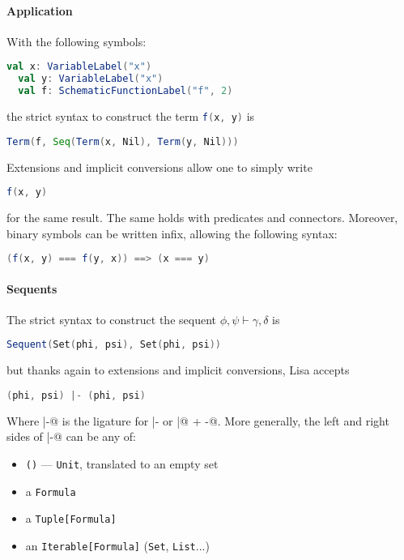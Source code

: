 \paragraph{Application}
With the following symbols:
\begin{lstlisting}[language=Scala]
  val x: VariableLabel("x")
  val y: VariableLabel("x")
  val f: SchematicFunctionLabel("f", 2)
\end{lstlisting}
the strict syntax to construct the term \lstinline[language=Scala]|f(x, y)| is
\begin{lstlisting}[language=Scala]
  Term(f, Seq(Term(x, Nil), Term(y, Nil)))
\end{lstlisting}
Extensions and implicit conversions allow one to simply write
\begin{lstlisting}[language=Scala]
  f(x, y)
\end{lstlisting}
for the same result. The same holds with predicates and connectors. Moreover, binary symbols can be written infix, allowing the following syntax:

\begin{lstlisting}[language=Scala]
  (f(x, y) === f(y, x)) ==> (x === y)
\end{lstlisting}

\paragraph{Sequents}
The strict syntax to construct the sequent $\phi, \psi \vdash \gamma, \delta$ is
\begin{lstlisting}[language=Scala]
  Sequent(Set(phi, psi), Set(phi, psi))
\end{lstlisting}
but thanks again to  extensions and implicit conversions, Lisa accepts
\begin{lstlisting}[language=Scala]
  (phi, psi) |- (phi, psi)
\end{lstlisting}
Where \lstinline@|-@ is the ligature for { |- } or \lstinline@|@ + \lstinline@-@. More generally, the left and right sides of \lstinline@|-@ can be any of:
\vspace*{-0.7em}
\begin{itemize}
  \setlength\itemsep{-0.5em}
  \item \lstinline|()| --- \lstinline|Unit|, translated to an empty set
  \item a \lstinline|Formula|
  \item a \lstinline|Tuple[Formula]|
  \item an \lstinline|Iterable[Formula]| (\lstinline|Set|, \lstinline|List|...)
\end{itemize}
